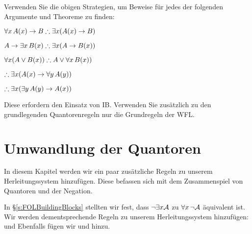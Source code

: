 \problempart
Verwenden Sie die obigen Strategien, um Beweise für jedes der folgenden Argumente und Theoreme zu finden:
\begin{earg}
\item $\forall x\,\atom{A}{x} \eif B \therefore \exists x(\atom{A}{x} \eif B)$
\item $A \eif \exists x\, \atom{B}{x} \therefore \exists x(A \eif \atom{B}{x})$
\item $\forall x(A \eor \atom{B}{x}) \therefore A \eor \forall x\,\atom{B}{x})$
\item $\therefore \exists x(\atom{A}{x} \eif \forall y\,\atom{A}{y})$
\item $\therefore \exists x(\exists y\,\atom{A}{y} \eif \atom{A}{x})$
\end{earg}
Diese erfordern den Einsatz von IB. Verwenden Sie zusätzlich zu den grundlegenden Quantorenregeln nur die Grundregeln der WFL.

\chapter{Umwandlung der Quantoren}\label{s:CQ}

In diesem Kapitel werden wir ein paar zusätzliche Regeln zu unserem Herleitungssystem hinzufügen. Diese befassen sich mit dem Zusammenspiel von Quantoren und der Negation.
 
In \S\ref{s:FOLBuildingBlocks} stellten wir fest, dass $\neg\exists x\mathcal{A}$ zu $\forall x\, \neg\mathcal{A}$ äquivalent ist. Wir werden dementsprechende Regeln zu unserem Herleitungssystem hinzufügen:
und
Ebenfalls fügen wir
und
hinzu.

